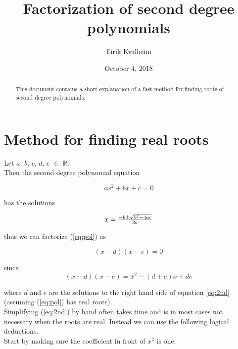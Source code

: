 \documentclass[a4paper]{article}
\title{Factorization of second degree polynomials}
\author{Eirik Kvalheim}
\date{October 4, 2018}
\newcommand{\R}{\mathbb{R}}
\begin{document}
\maketitle

\begin{abstract}
This document contains a short explanation of a fast method for finding roots of second degree polynomials.
\end{abstract}

\section{Method for finding real roots}
\label{sec:introduction}

Let $a$, $b$, $c$, $d$, $e$ $\in$ $\R$.\\
Then the second degree polynomial equation

\begin{equation}  \label{eq:pol}
	ax^2 + bx + c = 0
\end{equation}

has the solutions

\begin{equation} \label{eq:2nd}
	\begin{array}
		{*{20}c} {x = \frac{{ - b \pm \sqrt {b^2 - 4ac} }}{{2a}}} \\ 
	\end{array}
\end{equation}

thus we can factorize (\ref{eq:pol}) as

\begin{equation} \label{eq:fac}
 (x-d)(x-e) = 0
\end{equation}

since
\begin{equation} \label{eq:Chr}
	 (x-d)(x-e)=x^2-(d+e)x+de
\end{equation}

where $d$ and $e$ are the solutions to the right hand side of equation \ref{eq:2nd} (assuming (\ref{eq:pol}) has real roots).\\ \newline Simplifying
(\ref{eq:2nd}) by hand often takes time and is in most cases not necessary when the roots are real.
Instead we can use the following logical deductions.\\

Start by making sure the coefficient in front of $x^2$ is one:
\end{document}
